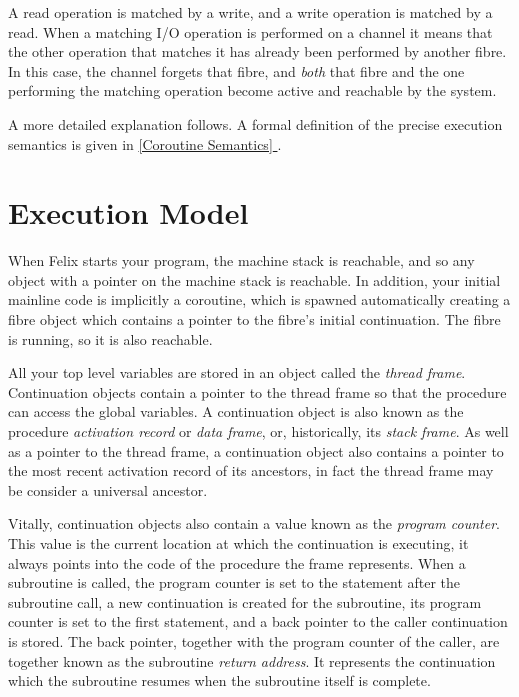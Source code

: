 \documentclass[oneside]{book}
\newcommand*{\fullref}[1]{\hyperref[{#1}]{\autoref*{#1} \nameref*{#1}}}
\begin{document}
A read operation is matched by a write, and a write operation
is matched by a read. When a matching I/O operation is performed
on a channel it means that the other operation that matches it
has already been performed by another fibre. In this case,
the channel forgets that fibre, and {\em both} that fibre and the
one performing the matching operation become active and reachable
by the system.

A more detailed explanation follows. A formal definition of the
precise execution semantics is given in \fullref{Coroutine Semantics}.

\section{Execution Model}
When Felix starts your program, the machine stack is reachable,
and so any object with a pointer on the machine stack is reachable.
In addition, your initial mainline code is implicitly a coroutine,
which is spawned automatically creating a fibre object
which contains a pointer to the fibre's initial continuation.
The fibre is running, so it is also reachable.

All your top level variables are stored in an object called
the {\em thread frame}. Continuation objects
contain a pointer
to the thread frame so that the procedure can access the global
variables. A continuation object is also known as the procedure
{\em activation record} or {\em data frame}, or, historically,
its {\em stack frame}. As well as a pointer to the thread
frame, a continuation object also contains a pointer to the
most recent activation record of its ancestors, in fact the
thread frame may be consider a universal ancestor.

Vitally, continuation objects also contain a value known as
the {\em program counter}. This value is the current location at which
the continuation is executing, it always points into the code
of the procedure the frame represents. When a subroutine is
called, the program counter is set to the statement after the
subroutine call, a new continuation is created for the subroutine,
its program counter is set to the first statement, and a back pointer
to the caller continuation is stored. The back pointer, together with
the program counter of the caller, are together known as the subroutine
{\em return address}. It represents the continuation which the
subroutine resumes when the subroutine itself is complete.
\end{document}
